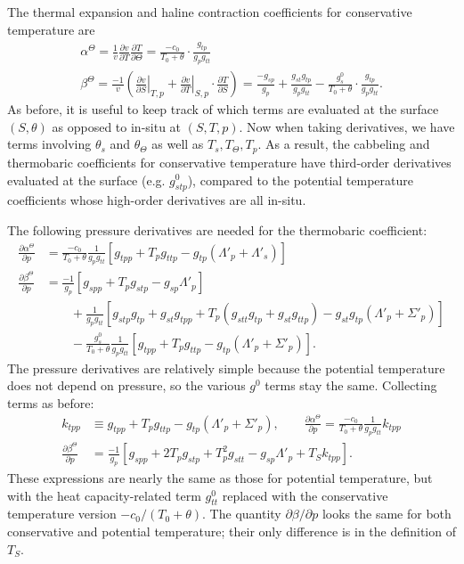 \documentclass{article}
\begin{document}
The thermal expansion and haline contraction coefficients for conservative temperature are
\begin{gather*}
    \alpha^{\Theta} = \frac{1}{v} \frac{\partial v}{\partial T} \frac{\partial T}{\partial \Theta} = \frac{-c_0}{T_0 + \theta} \cdot \frac{g_{tp}}{g_p g_{tt}} \\
    \beta^{\Theta} = \frac{-1}{v} \left( \left. \frac{\partial v}{\partial S} \right|_{T,p} + \left. \frac{\partial v}{\partial T} \right|_{S,p} \cdot \frac{\partial T}{\partial S} \right) = \frac{-g_{sp}}{g_p} + \frac{g_{st} g_{tp}}{g_p g_{tt}} - \frac{g^0_s}{T_0 + \theta} \cdot \frac{g_{tp}}{g_p g_{tt}}.
\end{gather*}
As before, it is useful to keep track of which terms are evaluated at the surface $(S,\theta)$ as opposed to in-situ at $(S,T,p)$. Now when taking derivatives, we have terms involving $\theta_s$ and $\theta_{\Theta}$ as well as $T_s, T_{\Theta}, T_p$. As a result, the cabbeling and thermobaric coefficients for conservative temperature have third-order derivatives evaluated at the surface (e.g. $g^0_{stp}$), compared to the potential temperature coefficients whose high-order derivatives are all in-situ.

The following pressure derivatives are needed for the thermobaric coefficient:
\begin{align*}
    \frac{\partial \alpha^{\Theta}}{\partial p} &= \frac{-c_0}{T_0 + \theta} \frac{1}{g_p g_{tt}} \left[ g_{tpp} + T_p g_{ttp} - g_{tp} (\Lambda'_p + \Lambda'_s) \right] \\
    \frac{\partial \beta^{\Theta}}{\partial p} &= \frac{-1}{g_p} \left[ g_{spp} + T_p g_{stp} - g_{sp} \Lambda'_p \right] \\
    &\qquad + \frac{1}{g_p g_{tt}} \left[ g_{stp} g_{tp} + g_{st} g_{tpp} + T_p \left( g_{stt} g_{tp} + g_{st} g_{ttp} \right) - g_{st} g_{tp} (\Lambda'_p + \Sigma'_p) \right] \\
    &\qquad - \frac{g^0_s}{T_0 + \theta} \frac{1}{g_p g_{tt}} \left[ g_{tpp} + T_p g_{ttp} - g_{tp} (\Lambda'_p + \Sigma'_p) \right].
\end{align*}
The pressure derivatives are relatively simple because the potential temperature does not depend on pressure, so the various $g^0$ terms stay the same. Collecting terms as before:
\begin{align*}
    k_{tpp} &\equiv g_{tpp} + T_p g_{ttp} - g_{tp} (\Lambda'_p + \Sigma'_p), \qquad \frac{\partial \alpha^{\Theta}}{\partial p} = \frac{-c_0}{T_0 + \theta} \frac{1}{g_p g_{tt}} k_{tpp} \\
    \frac{\partial \beta^{\Theta}}{\partial p} &= \frac{-1}{g_p} \left[ g_{spp} + 2 T_p g_{stp} + T_p^2 g_{stt} - g_{sp} \Lambda'_p + T_S k_{tpp} \right].
\end{align*}
These expressions are nearly the same as those for potential temperature, but with the heat capacity-related term $g^0_{tt}$ replaced with the conservative temperature version $-c_0/(T_0 + \theta)$. The quantity $\partial \beta/\partial p$ looks the same for both conservative and potential temperature; their only difference is in the definition of $T_S$.
\end{document}
